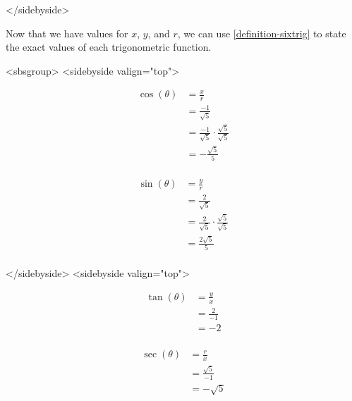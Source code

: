             
              
              
            
          </sidebyside>
          
            Now that we have values for $x$, $y$, and $r$, we can use \ref{definition-sixtrig} to state the exact values of each trigonometric function.
          
          <sbsgroup>
            <sidebyside valign="top">
              
                \begin{align*}
                   \cos(\theta) &= \frac{x}{r} \\
                   &= \frac{-1}{\sqrt{5}} \\
                   &= \frac{-1}{\sqrt{5}} \cdot \frac{\sqrt{5}}{\sqrt{5}} \\
                   &= -\frac{\sqrt{5}}{5} \\
                \end{align*}
              
              
                \begin{align*}
                   \sin(\theta) &= \frac{y}{r} \\
                   &= \frac{2}{\sqrt{5}} \\
                   &= \frac{2}{\sqrt{5}} \cdot \frac{\sqrt{5}}{\sqrt{5}} \\
                   &= \frac{2\sqrt{5}}{5} \\
                \end{align*}
              
            </sidebyside>
            <sidebyside valign="top">
              
                \begin{align*}
                   \tan(\theta) &= \frac{y}{x} \\
                   &= \frac{2}{-1} \\
                   &= -2 \\
                \end{align*}
              
              
                \begin{align*}
                   \sec(\theta) &= \frac{r}{x} \\
                   &= \frac{\sqrt{5}}{-1} \\
                   &= -\sqrt{5} \\
                \end{align*}
              
